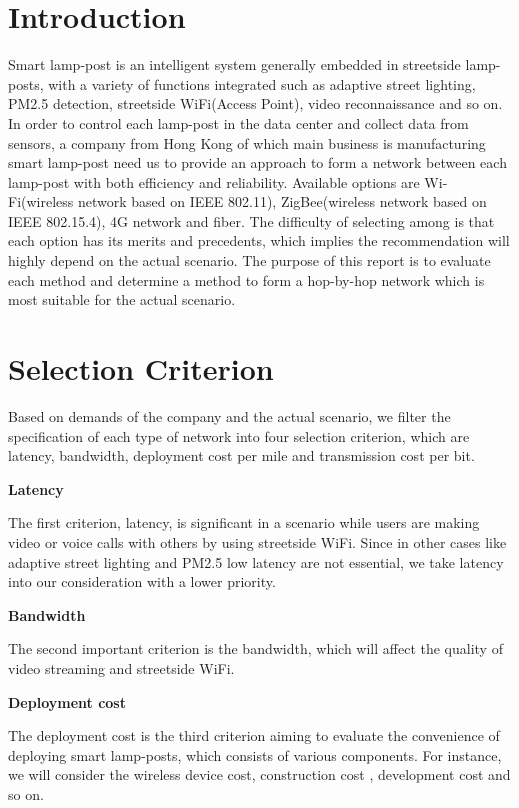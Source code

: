 \documentclass[12pt]{article}
\begin{document}
	\section{Introduction}
	Smart lamp-post is an intelligent system generally embedded in streetside lamp-posts, with a variety of functions integrated such as adaptive street lighting, PM2.5 detection, streetside WiFi(Access Point), video reconnaissance and so on. In order to control each lamp-post in the data center and collect data from sensors, a company from Hong Kong of which main business is manufacturing smart lamp-post need us to provide an approach to form a network between each lamp-post with both efficiency and reliability. Available options are Wi-Fi(wireless network based on IEEE 802.11), ZigBee(wireless network based on IEEE 802.15.4), 4G network and fiber. The difficulty of selecting among is that each option has its merits and precedents, which implies the recommendation will highly depend on the actual scenario. The purpose of this report is to evaluate each method and determine a method to form a hop-by-hop network which is most suitable for the actual scenario.
	
	\section{Selection Criterion}
	Based on demands of the company and the actual scenario, we filter the specification of each type of network into four selection criterion, which are latency, bandwidth, deployment cost per mile and transmission cost per bit. \\ \par 
	
	\textbf{Latency} \par 
	The first criterion, latency, is significant in a scenario while users are making video or voice calls with others by using streetside WiFi. Since in other cases like adaptive street lighting and PM2.5 low latency are not essential, we take latency into our consideration with a lower priority.
	
	\par  
	
	\textbf{Bandwidth} \par 
	The second important criterion is the bandwidth, which will affect the quality of video streaming and streetside WiFi. 
	\par 
	
	\textbf{Deployment cost} \par 
	The deployment cost is the third criterion aiming to evaluate the convenience of deploying smart lamp-posts, which consists of various components. For instance, we will consider the wireless device cost, construction cost , development cost and so on. 
	\par 
	
\end{document}
